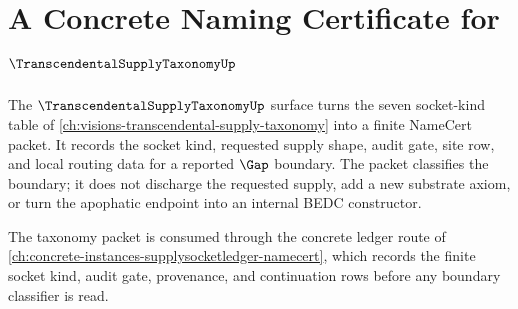 \chapter{A Concrete Naming Certificate for $\TranscendentalSupplyTaxonomyUp$}
\label{ch:concrete-instances-transcendentalsupplytaxonomy-namecert}

The $\TranscendentalSupplyTaxonomyUp$ surface turns the seven socket-kind table of \autoref{ch:visions-transcendental-supply-taxonomy} into a finite NameCert packet. It records the socket kind, requested supply shape, audit gate, site row, and local routing data for a reported $\Gap$ boundary. The packet classifies the boundary; it does not discharge the requested supply, add a new substrate axiom, or turn the apophatic endpoint into an internal BEDC constructor.

The taxonomy packet is consumed through the concrete ledger route of \autoref{ch:concrete-instances-supplysocketledger-namecert}, which records the finite socket kind, audit gate, provenance, and continuation rows before any boundary classifier is read.

